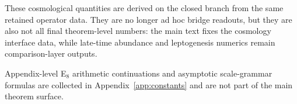 \begin{remark}
These cosmological quantities are derived on the closed branch from the same retained operator
data. They are no longer ad hoc bridge readouts, but they are also not all final theorem-level
numbers: the main text fixes the cosmology interface data, while late-time abundance and
leptogenesis numerics remain comparison-layer outputs.
\end{remark}

Appendix-level E$_8$ arithmetic continuations and asymptotic scale-grammar formulas are collected
in Appendix~\ref{app:constants} and are not part of the main theorem surface.


